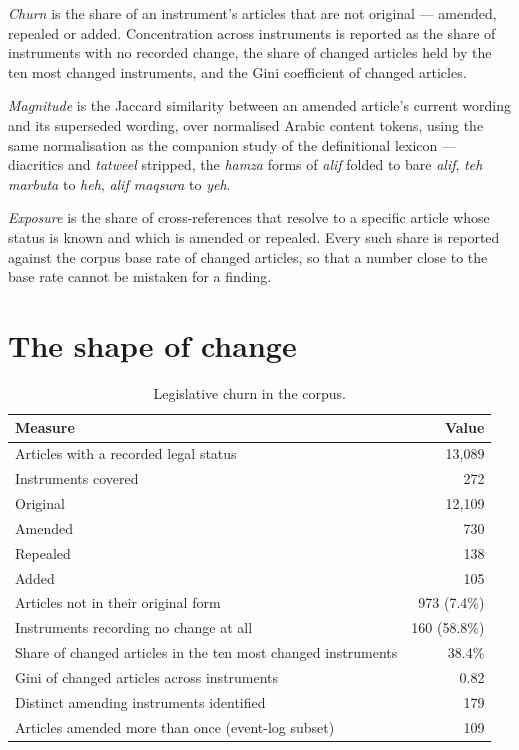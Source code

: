 \documentclass[11pt]{article}
\begin{document}
\emph{Churn} is the share of an instrument's articles that are not original
--- amended, repealed or added. Concentration across instruments is reported
as the share of instruments with no recorded change, the share of changed
articles held by the ten most changed instruments, and the Gini coefficient of
changed articles.

\emph{Magnitude} is the Jaccard similarity between an amended article's
current wording and its superseded wording, over normalised Arabic content
tokens, using the same normalisation as the companion study of the
definitional lexicon --- diacritics and \emph{tatweel} stripped, the
\emph{hamza} forms of \emph{alif} folded to bare \emph{alif}, \emph{teh
marbuta} to \emph{heh}, \emph{alif maqsura} to \emph{yeh}.

\emph{Exposure} is the share of cross-references that resolve to a specific
article whose status is known and which is amended or repealed. Every such
share is reported against the corpus base rate of changed articles, so that a
number close to the base rate cannot be mistaken for a finding.

\section{The shape of change}

\begin{table}[t]
\centering
\small
\begin{tabular}{lr}
\toprule
\textbf{Measure} & \textbf{Value} \\
\midrule
Articles with a recorded legal status & 13,089 \\
Instruments covered & 272 \\
\midrule
Original & 12,109 \\
Amended & 730 \\
Repealed & 138 \\
Added & 105 \\
\midrule
Articles not in their original form & 973 (7.4\%) \\
\midrule
Instruments recording no change at all & 160 (58.8\%) \\
Share of changed articles in the ten most changed instruments & 38.4\% \\
Gini of changed articles across instruments & 0.82 \\
\midrule
Distinct amending instruments identified & 179 \\
Articles amended more than once (event-log subset) & 109 \\
\bottomrule
\end{tabular}
\caption{Legislative churn in the corpus.}
\label{tab:inventory}
\end{table}
\end{document}
